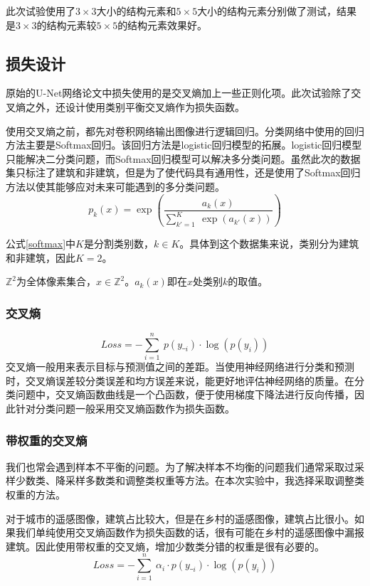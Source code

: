 此次试验使用了$3\times 3$大小的结构元素和$5\times 5$大小的结构元素分别做了测试，结果是$3\times 3$的结构元素较$5\times 5$的结构元素效果好。

\subsection{损失设计}
原始的U-Net网络论文中损失使用的是交叉熵加上一些正则化项。此次试验除了交叉熵之外，还设计使用类别平衡交叉熵作为损失函数。

使用交叉熵之前，都先对卷积网络输出图像进行逻辑回归。分类网络中使用的回归方法主要是Softmax回归。该回归方法是logistic回归模型的拓展。logistic回归模型只能解决二分类问题，而Softmax回归模型可以解决多分类问题。虽然此次的数据集只标注了建筑和非建筑，但是为了使代码具有通用性，还是使用了Softmax回归方法以使其能够应对未来可能遇到的多分类问题。
\begin{equation}\label{softmax}
    p_k(x)=\exp(\frac{a_k(x)}{\sum\limits_{k'=1}^K \ \exp(a_{k'}(x))})
\end{equation}

公式\ref{softmax}中$K$是分割类别数，$k\in K$。具体到这个数据集来说，类别分为建筑和非建筑，因此$K=2$。

$\mathbb{Z}^2$为全体像素集合，$x\in \mathbb{Z}^2$。$a_k(x)$即在$x$处类别$k$的取值。
\subsubsection{交叉熵}
\begin{equation}
    Loss=-\sum\limits_{i=1}^n\ p(y\__i)\cdot \log(p(y_i))
\end{equation}
交叉熵一般用来表示目标与预测值之间的差距。当使用神经网络进行分类和预测时，交叉熵误差较分类误差和均方误差来说，能更好地评估神经网络的质量。在分类问题中，交叉熵函数曲线是一个凸函数，便于使用梯度下降法进行反向传播，因此针对分类问题一般采用交叉熵函数作为损失函数。
\subsubsection{带权重的交叉熵}
我们也常会遇到样本不平衡的问题。为了解决样本不均衡的问题我们通常采取过采样少数类、降采样多数类和调整类权重等方法。在本次实验中，我选择采取调整类权重的方法。

对于城市的遥感图像，建筑占比较大，但是在乡村的遥感图像，建筑占比很小。如果我们单纯使用交叉熵函数作为损失函数的话，很有可能在乡村的遥感图像中漏报建筑。因此使用带权重的交叉熵，增加少数类分错的权重是很有必要的。
\begin{equation}\label{entropy}
    Loss=-\sum\limits_{i=1}^n\ \alpha_i\cdot p(y\__i)\cdot \log(p(y_i))
\end{equation}

